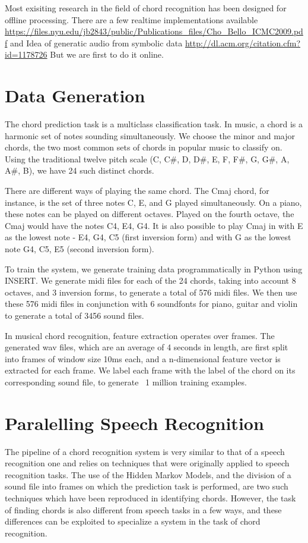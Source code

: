 \documentclass{article}
\begin{document}
Most exisiting research in the field of chord recognition has been designed for offline processing. There are a few realtime implementations available \url{https://files.nyu.edu/jb2843/public/Publications_files/Cho_Bello_ICMC2009.pdf} and  Idea of generatic audio from symbolic data \url{http://dl.acm.org/citation.cfm?id=1178726}
But we are first to do it online.

\section{Data Generation}
The chord prediction task is a multiclass classification task. In music, a chord is a harmonic set of notes sounding simultaneously. We choose the minor and major chords, the two most common sets of chords in popular music to classify on. Using the traditional twelve pitch scale (C, C\#, D, D\#, E, F, F\#, G, G\#, A, A\#, B), we have 24 such distinct chords.

There are different ways of playing the same chord. The Cmaj chord, for instance, is the set of three notes C, E, and G played simultaneously. On a piano, these notes can be played on different octaves. Played on the fourth octave, the Cmaj would have the notes C4, E4, G4. It is also possible to play Cmaj in with E as the lowest note - E4, G4, C5 (first inversion form) and with G as the lowest note G4, C5, E5 (second inversion form).

To train the system, we generate training data programmatically in Python using INSERT. We generate midi files for each of the 24 chords, taking into account 8 octaves, and 3 inversion forms, to generate a total of 576 midi files. We then use these 576 midi files in conjunction with 6 soundfonts for piano, guitar and violin to generate a total of 3456 sound files.

In musical chord recognition, feature extraction operates over frames. The generated wav files, which are an average of 4 seconds in length, are first split into frames of window size 10ms each, and a n-dimensional feature vector is extracted for each frame. We label each frame with the label of the chord on its corresponding sound file, to generate ~1 million training examples.

\section{Paralelling Speech Recognition}

The pipeline of a chord recognition system is very similar to that of a speech recognition one and relies on techniques that were originally applied to speech recognition tasks. The use of the Hidden Markov Models, and the division of a sound file into frames on which the prediction task is performed, are two such techniques which have been reproduced in identifying chords. However, the task of finding chords is also different from speech tasks in a few ways, and these differences can be exploited to specialize a system in the task of chord recognition.
\end{document}
